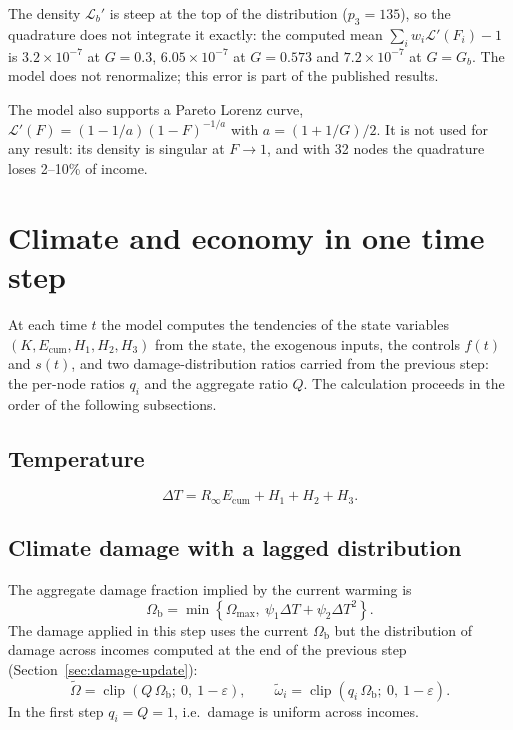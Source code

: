 \documentclass[11pt]{article}
\newcommand{\clip}{\operatorname{clip}}
\newcommand{\Lor}{\mathcal{L}}
\newcommand{\Ecum}{E_{\mathrm{cum}}}
\newcommand{\Omb}{\Omega_{\mathrm{b}}}
\begin{document}
The density $\Lor_b'$ is steep at the top of the distribution ($p_3 = 135$),
so the quadrature does not integrate it exactly: the computed mean
$\sum_i w_i \Lor'(F_i) - 1$ is $3.2\times10^{-7}$ at $G = 0.3$,
$6.05\times10^{-7}$ at $G = 0.573$ and $7.2\times10^{-7}$ at $G = G_b$. The
model does not renormalize; this error is part of the published results.

The model also supports a Pareto Lorenz curve, $\Lor'(F) = (1 - 1/a)(1-F)^{-1/a}$
with $a = (1 + 1/G)/2$. It is not used for any result: its density is singular
at $F\to1$, and with 32 nodes the quadrature loses 2--10\% of income.

\section{Climate and economy in one time step}
\label{sec:step}

At each time $t$ the model computes the tendencies of the state variables
$(K, \Ecum, H_1, H_2, H_3)$ from the state, the exogenous inputs, the controls
$f(t)$ and $s(t)$, and two damage-distribution ratios carried from the
previous step: the per-node ratios $q_i$ and the aggregate ratio $Q$. The
calculation proceeds in the order of the following subsections.

\subsection{Temperature}

\begin{equation}
  \Delta T = R_\infty \Ecum + H_1 + H_2 + H_3 .
\end{equation}

\subsection{Climate damage with a lagged distribution}
\label{sec:damage}

The aggregate damage fraction implied by the current warming is
\begin{equation}
  \Omb = \min\left\{\Omega_{\max},\ \psi_1\Delta T + \psi_2 \Delta T^2\right\}.
  \label{eq:damage-base}
\end{equation}
The damage applied in this step uses the current $\Omb$ but the distribution
of damage across incomes computed at the end of the previous step
(Section~\ref{sec:damage-update}):
\begin{equation}
  \tilde\Omega = \clip(Q\,\Omb;\ 0,\ 1-\varepsilon), \qquad
  \tilde\omega_i = \clip(q_i\,\Omb;\ 0,\ 1-\varepsilon).
  \label{eq:damage-lagged}
\end{equation}
In the first step $q_i = Q = 1$, i.e.\ damage is uniform across incomes.
\end{document}
